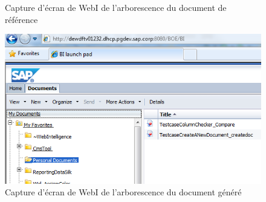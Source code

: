 \begin{description}
\begin{figure}[!h]
  \caption{Capture d'écran de WebI de l'arborescence du document de référence}
	\label{figure:savedReferenceDocPath}
\end{figure}
\begin{figure}[!h]
  \centering
      \includegraphics{images/savedGeneratedDocPath.png}
  \caption{Capture d'écran de WebI de l'arborescence du document généré}
	\label{figure:savedGeneratedDocPath}
\end{figure}



\end{description}
